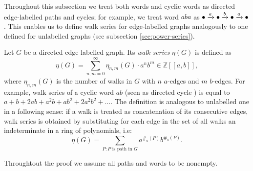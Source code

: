Throughout this subsection we treat both words and cyclic words as directed edge-labelled paths and cycles; for example, we treat word $aba$ as $\bullet\xrightarrow{a}\bullet\xrightarrow{b}\bullet\xrightarrow{a}\bullet$. This enables us to define walk series for edge-labelled graphs analogously to one defined for unlabelled graphs (see subsection \ref{sec:power-series}).

Let $G$ be a directed edge-labelled graph. Its \emph{walk series} $\eta(G)$ is defined as $$\eta(G) = \sum_{n,m=0}^{\infty}\eta_{n,m}(G)\cdot a^n b^m \in \mathbb{Z}[[a,b]],$$ where $\eta_{n,m}(G)$ is the number of walks in $G$ with $n$ $a$-edges and $m$ $b$-edges. For example, walk series of a cyclic word $ab$ (seen as directed cycle
) is equal to $a + b + 2ab + a^2b + ab^2+2a^2b^2+\ldots.$
The definition is analogous to unlabelled one in a following sense: if a walk is treated as concatenation of its consecutive edges, walk series is obtained by substituting for each edge in the set of all walks an indeterminate in a ring of polynomials, i.e:
$$
\eta(G) = \sum_{P: P \text{ is path in } G}a^{\#_a(P)}b^{\#_b(P)}.
$$

\iffalse

Throughtout the proof we assume all paths and words to be nonempty.


